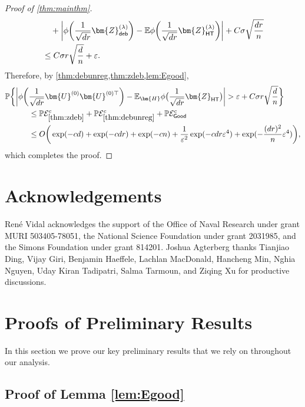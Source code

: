 \documentclass[10pt]{article}
\newcommand{\eps}{\ensuremath{\varepsilon}}
\newcommand{\p}{\mathbb{P}}
\theoremstyle{definition}
\begin{document}
\begin{proof}[Proof of \cref{thm:mainthm}]
\begin{align}
    &\quad + \bigg| \phi \bigg( \frac{1}{\sqrt{dr}} \bm{Z}^{(\lambda)}_{{\sf deb}}  \bigg) -  \mathbb{E} \phi \bigg( \frac{1}{\sqrt{dr}} \bm{Z}^{(\lambda)}_{{\sf HT}} \bigg) \bigg| + C \sigma \sqrt{\frac{dr}{n}}  \\
    &\leq C \sigma r \sqrt{\frac{d}{n}} + \eps.
\end{align}
Therefore, by \cref{thm:debunreg,thm:zdeb,lem:Egood},
\begin{align*}
    \p\bigg\{\bigg| \phi\bigg( &\frac{1}{\sqrt{dr}} \bm{U}^{(0)} \bm{U}^{(0)\top} \bigg) - \mathbb{E}_{\bm{H}} \phi\big( \frac{1}{\sqrt{dr}} \bm{Z}_{{\sf HT}} \big) \bigg| > \eps + C \sigma r \sqrt{\frac{d}{n}} \bigg\}\\
    &\leq \p \mathcal{E}_{\mathrm{\cref{thm:zdeb}}}^c  + \p  \mathcal{E}_{\mathrm{\cref{thm:debunreg}}}^c + \p\mathcal{E}_{{\sf Good}}^c \\
    &\leq O\bigg( \exp( - c d) +  \exp( - c dr) + \exp( - c n) + \frac{1}{\eps^2} \exp(-c dr \eps^4 ) + \exp( - \frac{(dr)^2}{n} \eps^4) \bigg),
\end{align*}
which completes the proof. 
\end{proof}


\section*{Acknowledgements}
Ren\'e Vidal acknowledges the support of the Office of Naval Research under grant MURI 503405-78051, the National Science Foundation under grant 2031985, and the Simons Foundation under grant 814201. Joshua Agterberg thanks Tianjiao Ding, Vijay Giri, Benjamin Haeffele, Lachlan MacDonald, Hancheng Min, Nghia Nguyen, Uday Kiran Tadipatri, Salma Tarmoun,  and Ziqing Xu for productive discussions.

\appendix

\section{Proofs of Preliminary Results}
In this section we prove our key preliminary results that we rely on throughout our analysis.  




\subsection{Proof of Lemma \ref{lem:Egood}}
\label{sec:proofofegood}
\end{document}
